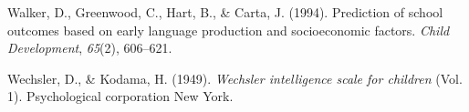 \documentclass[
  man,floatsintext]{apa6}
\newlength{\cslhangindent}
\newlength{\cslentryspacingunit} %
\newenvironment{CSLReferences}[2] %
 {%
  \setlength{\parindent}{0pt}
  \ifodd #1
  \let\oldpar\par
  \def\par{\hangindent=\cslhangindent\oldpar}
  \fi
  \setlength{\parskip}{#2\cslentryspacingunit}
 }%
 {}
\begin{document}
\begin{CSLReferences}{1}{0}
\leavevmode{}%
Walker, D., Greenwood, C., Hart, B., \& Carta, J. (1994). Prediction of school outcomes based on early language production and socioeconomic factors. \emph{Child Development}, \emph{65}(2), 606--621.

\leavevmode{}%
Wechsler, D., \& Kodama, H. (1949). \emph{Wechsler intelligence scale for children} (Vol. 1). Psychological corporation New York.

\end{CSLReferences}
\end{document}
